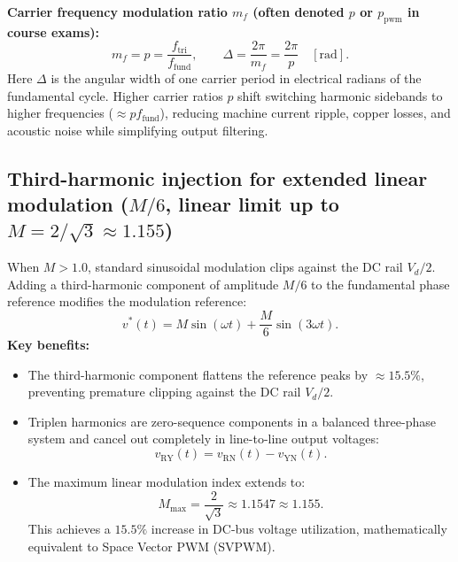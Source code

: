\textbf{Carrier frequency modulation ratio \(m_f\) (often denoted \(p\) or \(p_{\mathrm{pwm}}\) in course exams):}
\[
m_f = p = \frac{f_{\mathrm{tri}}}{f_{\mathrm{fund}}},
\qquad
\Delta = \frac{2\pi}{m_f} = \frac{2\pi}{p} \quad [\mathrm{rad}].
\]
Here \(\Delta\) is the angular width of one carrier period in electrical radians of the fundamental cycle.
Higher carrier ratios \(p\) shift switching harmonic sidebands to higher frequencies (\(\approx p f_{\mathrm{fund}}\)), reducing machine current ripple, copper losses, and acoustic noise while simplifying output filtering.

\subsection{Third-harmonic injection for extended linear modulation (\texorpdfstring{$M/6$}{M/6}, linear limit up to \texorpdfstring{$M = 2/\sqrt{3} \approx 1.155$}{M = 2/sqrt(3) approx 1.155})}
When \(M > 1.0\), standard sinusoidal modulation clips against the DC rail \(V_d/2\). Adding a third-harmonic component of amplitude \(M/6\) to the fundamental phase reference modifies the modulation reference:
\[
v^*(t) = M \sin(\omega t) + \frac{M}{6}\sin(3\omega t).
\]
\textbf{Key benefits:}
\begin{itemize}
  \item The third-harmonic component flattens the reference peaks by \(\approx 15.5\%\), preventing premature clipping against the DC rail \(V_d/2\).
  \item Triplen harmonics are zero-sequence components in a balanced three-phase system and cancel out completely in line-to-line output voltages:
  \[
  v_{\mathrm{RY}}(t) = v_{\mathrm{RN}}(t) - v_{\mathrm{YN}}(t).
  \]
  \item The maximum linear modulation index extends to:
  \[
  M_{\max} = \frac{2}{\sqrt{3}} \approx 1.1547 \approx 1.155.
  \]
  This achieves a \(15.5\%\) increase in DC-bus voltage utilization, mathematically equivalent to Space Vector PWM (SVPWM).
\end{itemize}

